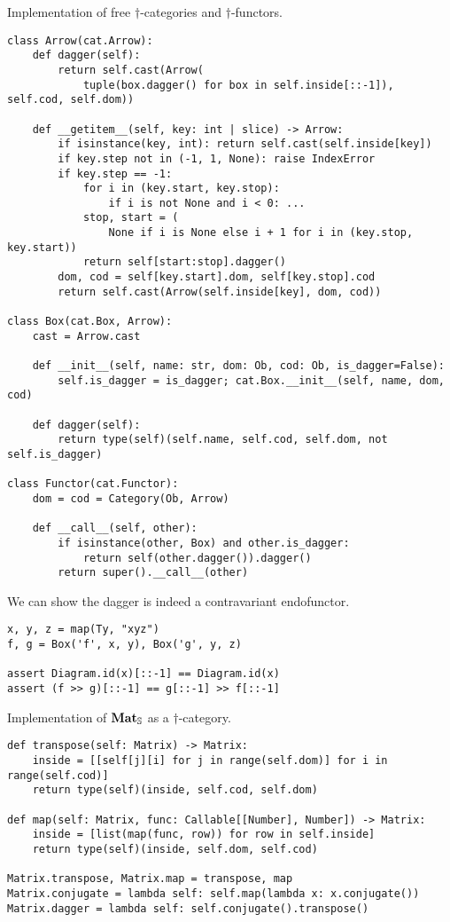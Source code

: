 \begin{python}
{\normalfont Implementation of free $\dagger$-categories and $\dagger$-functors.}
\begin{verbatim}
class Arrow(cat.Arrow):
    def dagger(self):
        return self.cast(Arrow(
            tuple(box.dagger() for box in self.inside[::-1]), self.cod, self.dom))

    def __getitem__(self, key: int | slice) -> Arrow:
        if isinstance(key, int): return self.cast(self.inside[key])
        if key.step not in (-1, 1, None): raise IndexError
        if key.step == -1:
            for i in (key.start, key.stop):
                if i is not None and i < 0: ...
            stop, start = (
                None if i is None else i + 1 for i in (key.stop, key.start))
            return self[start:stop].dagger()
        dom, cod = self[key.start].dom, self[key.stop].cod
        return self.cast(Arrow(self.inside[key], dom, cod))

class Box(cat.Box, Arrow):
    cast = Arrow.cast

    def __init__(self, name: str, dom: Ob, cod: Ob, is_dagger=False):
        self.is_dagger = is_dagger; cat.Box.__init__(self, name, dom, cod)

    def dagger(self):
        return type(self)(self.name, self.cod, self.dom, not self.is_dagger)

class Functor(cat.Functor):
    dom = cod = Category(Ob, Arrow)

    def __call__(self, other):
        if isinstance(other, Box) and other.is_dagger:
            return self(other.dagger()).dagger()
        return super().__call__(other)
\end{verbatim}
\end{python}

\begin{example}
We can show the dagger is indeed a contravariant endofunctor.

\begin{verbatim}
x, y, z = map(Ty, "xyz")
f, g = Box('f', x, y), Box('g', y, z)

assert Diagram.id(x)[::-1] == Diagram.id(x)
assert (f >> g)[::-1] == g[::-1] >> f[::-1]
\end{verbatim}
\end{example}

\begin{python}
{\normalfont Implementation of $\mathbf{Mat}_\S$ as a $\dagger$-category.}

\begin{verbatim}
def transpose(self: Matrix) -> Matrix:
    inside = [[self[j][i] for j in range(self.dom)] for i in range(self.cod)]
    return type(self)(inside, self.cod, self.dom)

def map(self: Matrix, func: Callable[[Number], Number]) -> Matrix:
    inside = [list(map(func, row)) for row in self.inside]
    return type(self)(inside, self.dom, self.cod)

Matrix.transpose, Matrix.map = transpose, map
Matrix.conjugate = lambda self: self.map(lambda x: x.conjugate())
Matrix.dagger = lambda self: self.conjugate().transpose()
\end{verbatim}
\end{python}

